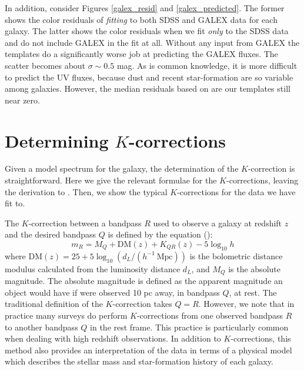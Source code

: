 \documentclass[12pt,preprint]{aastex}
\begin{document}
In addition, consider Figures \ref{galex_resid} and
\ref{galex_predicted}. The former shows the color residuals of {\it
fitting} to both SDSS and GALEX data for each galaxy. The latter shows
the color residuals when we fit {\it only} to the SDSS data and do not
include GALEX in the fit at all. Without any input from GALEX the
templates do a significantly worse job at predicting the GALEX
fluxes. The scatter becomes about $\sigma \sim 0.5$ mag.  As is common
knowledge, it is more difficult to predict the UV fluxes, because dust
and recent star-formation are so variable among galaxies. However, the
median residuals based on are our templates still near zero.

\section{Determining $K$-corrections}
\label{kcorrect}

Given a model spectrum for the galaxy, the determination of the
$K$-correction is straightforward. Here we give the relevant formulae
for the $K$-corrections, leaving the derivation to \citet{hogg02a}.
Then, we show the typical $K$-corrections for the data we have fit
to. 

The $K$-correction between a bandpass $R$ used to observe a galaxy at
redshift $z$ and the desired bandpass $Q$ is defined by the equation
(\citealt{oke68a, hogg02a}):
\begin{equation}
\label{kcorrecteqn}
m_R = M_Q + \mathrm{DM}(z) + K_{QR}(z) - 5 \log_{10} h 
\end{equation}
where $\mathrm{DM}(z) = 25 + 5\log_{10} (d_L /
(h^{-1}{\mathrm{~Mpc}}))$ is the bolometric distance modulus
calculated from the luminosity distance $d_L$, and $M_Q$ is the
absolute magnitude. The absolute magnitude is defined as the apparent
magnitude an object would have if were observed 10 pc away, in
bandpass $Q$, at rest.  The traditional definition of the
$K$-correction takes $Q=R$. However, we note that in practice many
surveys do perform $K$-corrections from one observed bandpass $R$ to
another bandpass $Q$ in the rest frame. This practice is particularly
common when dealing with high redshift observations.  In addition to
$K$-corrections, this method also provides an interpretation of the
data in terms of a physical model which describes the stellar mass and
star-formation history of each galaxy.
\end{document}
